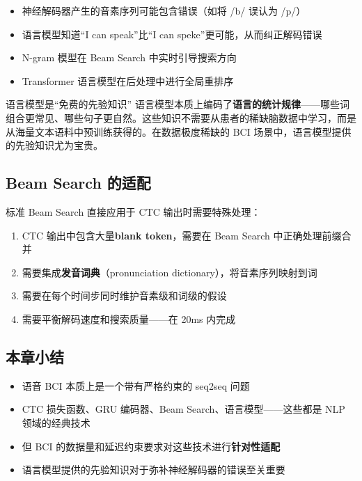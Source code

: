 \begin{itemize}
    \item 神经解码器产生的音素序列可能包含错误（如将 /b/ 误认为 /p/）
    \item 语言模型知道``I can speak''比``I can speke''更可能，从而纠正解码错误
    \item N-gram 模型在 Beam Search 中实时引导搜索方向
    \item Transformer 语言模型在后处理中进行全局重排序
\end{itemize}

\begin{importantbox}{语言模型是``免费的先验知识''}
语言模型本质上编码了\textbf{语言的统计规律}——哪些词组合更常见、哪些句子更自然。这些知识不需要从患者的稀缺脑数据中学习，而是从海量文本语料中预训练获得的。在数据极度稀缺的 BCI 场景中，语言模型提供的先验知识尤为宝贵。
\end{importantbox}

\subsection{Beam Search 的适配}

标准 Beam Search 直接应用于 CTC 输出时需要特殊处理：

\begin{enumerate}
    \item CTC 输出中包含大量\textbf{blank token}，需要在 Beam Search 中正确处理前缀合并
    \item 需要集成\textbf{发音词典}（pronunciation dictionary），将音素序列映射到词
    \item 需要在每个时间步同时维护音素级和词级的假设
    \item 需要平衡解码速度和搜索质量——在 20ms 内完成
\end{enumerate}

\subsection{本章小结}

\begin{itemize}
    \item 语音 BCI 本质上是一个带有严格约束的 seq2seq 问题
    \item CTC 损失函数、GRU 编码器、Beam Search、语言模型——这些都是 NLP 领域的经典技术
    \item 但 BCI 的数据量和延迟约束要求对这些技术进行\textbf{针对性适配}
    \item 语言模型提供的先验知识对于弥补神经解码器的错误至关重要
\end{itemize}


